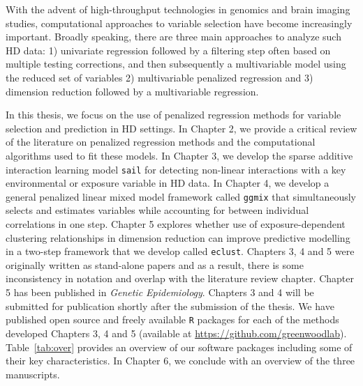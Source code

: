 With the advent of high-throughput technologies in genomics and brain imaging studies, computational approaches to variable selection have become increasingly important. Broadly speaking, there are three main approaches to analyze such HD data: 1) univariate regression followed by a filtering step often based on multiple testing corrections, and then subsequently a multivariable model using the reduced set of variables 2) multivariable penalized regression and 3) dimension reduction followed by a multivariable regression. 

In this thesis, we focus on the use of penalized regression methods for variable selection and prediction in HD settings. In Chapter 2, we provide a critical review of the literature on penalized regression methods and the computational algorithms used to fit these models. In Chapter 3, we develop the sparse additive interaction learning model \texttt{sail} for detecting non-linear interactions with a key environmental or exposure variable in HD data. In Chapter 4, we develop a general penalized linear mixed model framework called \texttt{ggmix} that simultaneously selects and estimates variables while accounting for between individual correlations in one step. Chapter 5 explores whether use of exposure-dependent clustering relationships in dimension reduction can improve predictive modelling in a two-step framework that we develop called \texttt{eclust}. Chapters 3, 4 and 5 were originally written as stand-alone papers and as a result, there is some inconsistency in notation and overlap with the literature review chapter. Chapter 5 has been published in \textit{Genetic Epidemiology}. Chapters 3 and 4 will be submitted for publication shortly after the submission of the thesis. We have published open source and freely available \texttt{R} packages for each of the methods developed Chapters 3, 4 and 5 (available at \url{https://github.com/greenwoodlab}). Table~\ref{tab:over} provides an overview of our software packages including some of their key characteristics. In Chapter 6, we conclude with an overview of the three manuscripts.  


